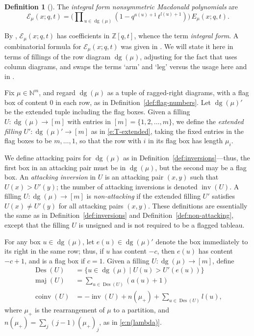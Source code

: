 \documentclass[12pt]{amsart}
\theoremstyle{definition}
\newtheorem{defn}[thm]{Definition}
\theoremstyle{remark}
\newcommand{\NN}{{\mathbb N}}
\newcommand{\ZZ}{{\mathbb Z}}
\newcommand{\Ecal}{{\mathcal E}}
\DeclareMathOperator{\dg}{dg}
\DeclareMathOperator{\inv}{inv}
\DeclareMathOperator{\coinv}{coinv}
\DeclareMathOperator{\maj}{maj}
\DeclareMathOperator{\Des}{Des}
\begin{document}
\begin{defn}[\cite{Knop97}]\label{def:integral-form}
The {\em integral form nonsymmetric Macdonald polynomials} are
\begin{equation}\label{e:integral-form}
\Ecal _{\mu }(x;q,t) = \bigl(\prod \nolimits_{\, u\in \dg (\mu )} (1-
q^{a(u)+1}\, t^{l(u)+1}) \bigr)\, E_{\mu }(x;q,t).
\end{equation}
\end{defn}

By \cite[Corollary~5.2]{Knop97}, $\Ecal _{\mu }(x;q,t)$ has
coefficients in $\ZZ [q,t]$, whence the term {\em integral form}.  A
combinatorial formula for $\Ecal _{\mu }(x;q,t)$ was given in
\cite{HagHaiLo08}.  We will state it here in terms of fillings of the
row diagram $\dg (\mu )$, adjusting for the fact that
\cite{HagHaiLo08} uses column diagrams, and swaps the terms `arm' and
`leg' versus the usage here and in \cite{Knop97}.

Fix $\mu \in \NN ^{m}$, and regard $\dg (\mu )$ as a tuple of
ragged-right diagrams, with a flag box of content $0$ in each row, as
in Definition~\ref{def:flag-numbers}.  Let $\dg (\mu )'$ be the
extended tuple including the flag boxes.  Given a filling $U\colon \dg
(\mu )\rightarrow [m]$ with entries in $[m]=\{1,2,\ldots,m \}$, we
define the {\em extended filling} $U':\dg (\mu )'\rightarrow [m]$ as
in \eqref{e:T-extended}, taking the fixed entries in the flag boxes to
be $m,\ldots,1$, so that the row with $i$ in its flag box has length
$\mu _{i}$.

We define attacking pairs for $\dg (\mu )$ as in
Definition~\ref{def:inversions}---thus, the first box in an attacking
pair must be in $\dg (\mu )$, but the second may be a flag box.  An
{\em attacking inversion} in $U$ is an attacking pair $(x,y)$ such
that $U(x)>U'(y)$; the number of attacking inversions is denoted $\inv
(U)$.  A filling $U\colon \dg (\mu )\rightarrow [m]$ is {\em
non-attacking} if the extended filling $U'$ satisfies $U(x)\not =
U'(y)$ for all attacking pairs $(x,y)$.  These definitions are
essentially the same as in Definition~\ref{def:inversions} and
Definition~\ref{def:non-attacking}, except that the filling $U$ is
unsigned and is not required to be a flagged tableau.

For any box $u\in \dg (\mu )$, let $e(u)\in \dg (\mu )'$ denote the
box immediately to its right in the same row; thus, if $u$ has content
$-c$, then $e(u)$ has content $-c+1$, and is a flag box if $c=1$.
Given a filling $U\colon \dg (\mu )\rightarrow [m]$, define
\begin{align}\label{e:Des}
\Des (U) & = \{ u\in \dg (\mu ) \mid U(u)>U'(e(u))\} \\
\label{e:maj}
\maj (U) & = \sum \nolimits_{u\in \Des (U)} (a(u)+1)\\
\label{e:coinv}
\coinv (U) & = - \inv (U) + n(\mu _{+}) + \sum \nolimits_{u\in \Des (U)} l(u),
\end{align}
where $\mu _{+}$ is the rearrangement of $\mu $ to a partition, and
$n(\mu _{+}) = \sum _{j}(j-1)(\mu _{+})_{j}$, as in
\eqref{e:n(lambda)}.
\end{document}
